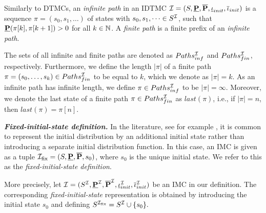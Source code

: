 \begin{definition}
    Similarly to DTMCs, an \textit{infinite path} in an IDTMC $\mathcal{I} = (S,\mathbf{\underline{P}},\mathbf{\overline{P}},\mathbf{\underline{\iota}}_{init},\mathbf{\overline{\iota}}_{init})$ is a sequence $\pi = (s_0,s_1,\dots)$ of states with $s_0,s_1,\dots \in S^{\mathcal{I}}$, such that $\mathbf{\underline{P}}(\pi[k],\pi[k+1])>0$ for all $k\in \mathbb{N}$. A \textit{finite path} is a finite prefix of an \textit{infinite path}.
\end{definition}
The sets of all infinite and finite paths are denoted as $Paths_{inf}^{\mathcal{I}}$ and $Paths_{fin}^{\mathcal{I}}$, respectively.
Furthermore, we define the length $|\pi|$ of a finite path $\pi = (s_0,\dots,s_k) \in Paths_{fin}^{\mathcal{I}}$ to be equal to $k$, which we denote as $|\pi| = k$. As an infinite path has infinite length, we define $\pi \in Paths_{inf}^{\mathcal{I}}$ to be $|\pi| = \infty$. Moreover, we denote the last state of a finite path $\pi \in Paths^{\mathcal{I}}_{fin}$ as $last(\pi)$, i.e., if $|\pi| = n$, then $last(\pi) = \pi[n]$.

\emph{\textbf{Fixed-initial-state definition.}}
In the literature, see for example \cite{complexity_model_checking_interval-valued_DTMCs,Model-Checking_presence_Uncertainties,Semantics_Quant-Analysis}, it is common to represent the initial distribution by an additional initial state rather than introducing a separate initial distribution function. In this case, an IMC is given as a tuple $\mathcal{I}_{\mathrm{fix}} = (S,\mathbf{\underline{P}},\mathbf{\overline{P}},s_{0})$, where \(s_{0}\) is the unique initial state. We refer to this as the \emph{fixed-initial-state definition}.

More precisely, let $\mathcal{I} = (S^{\mathcal{I}},\mathbf{\underline{P}}^{\mathcal{I}},\mathbf{\overline{P}}^{\mathcal{I}},\mathbf{\underline{\iota}}_{init}^{\mathcal{I}},\mathbf{\overline{\iota}}_{init}^{\mathcal{I}})$ be an IMC in our definition. The corresponding \textit{fixed-initial-state} representation is obtained by introducing the initial state $s_{0}$ and defining $S^{\mathcal{I}_{\mathrm{fix}}} = S^{\mathcal{I}}\cup\{s_{0}\}.$

